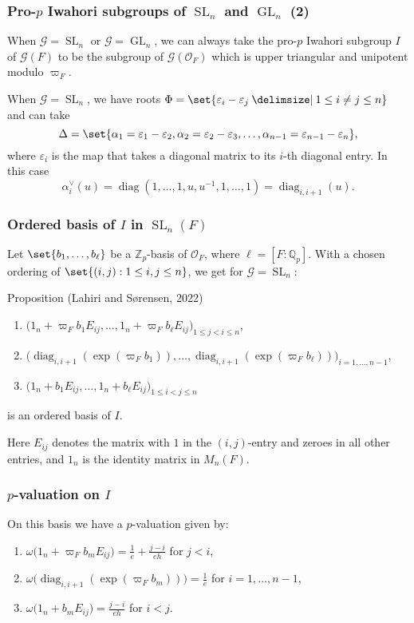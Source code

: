\documentclass{beamer}
\newcommand*\Z{\mathbb{Z}}
\newcommand*\Q{\mathbb{Q}}
\newcommand*\setSymbol[1][]{
  \nonscript\:#1\vert\allowbreak\nonscript\:\mathopen{}
}
\providecommand\given{}
\renewcommand*\given{\setSymbol[\delimsize]}
\DeclareMathOperator{\GL}{GL} %
\DeclareMathOperator{\SL}{SL} %
\DeclareMathOperator{\diag}{diag} %
\newcommand*\sO{\mathcal{O}}
\newcommand*\gs[1]{\mathcal{#1}}
\begin{document}
\begin{frame}[fragile]
  \frametitle{Pro-$p$ Iwahori subgroups of $\SL_{n}$ and $\GL_{n}$ (2)}

  When $\gs{G} = \SL_{n}$ or $\gs{G} = \GL_{n}$, we can always take the pro-$p$ Iwahori subgroup $I$ of $\gs{G}(F)$ to be the subgroup of $\gs{G}(\sO_{F})$ which is upper triangular and unipotent modulo $\varpi_{F}$.

  \pause

  When $\gs{G} = \SL_{n}$, we have roots $\Phi = \set{\varepsilon_{i}-\varepsilon_{j} \given 1 \leq i \neq j \leq n}$ and can take \[ \Delta = \set{ \alpha_{1}=\varepsilon_{1}-\varepsilon_{2},\alpha_{2}=\varepsilon_{2}-\varepsilon_{3},\dotsc, \alpha_{n-1}=\varepsilon_{n-1}-\varepsilon_{n} }, \] where $\varepsilon_{i}$ is the map that takes a diagonal matrix to its $i$-th diagonal entry. In this case \[ \alpha_{i}^{\vee}(u) = \diag(1,\dotsc,1,u,u^{-1},1,\dotsc,1) = \diag_{i,i+1}(u). \]
\end{frame}


\begin{frame}
  \frametitle{Ordered basis of $I$ in $\SL_{n}(F)$}

  Let $\set{b_{1},\dotsc,b_{\ell}}$ be a $\Z_{p}$-basis of $\sO_{F}$, where $\ell = [F:\Q_{p}]$. With a chosen ordering of $\set{(i,j) : 1 \leq i,j \leq n}$, we get for $\gs{G} = \SL_{n}$:
  \begin{block}{Proposition (Lahiri and Sørensen, 2022)}
    \begin{enumerate}[$\bullet$]
      \item $\bigl( 1_{n}+\varpi_{F}b_{1}E_{ij},\dotsc, 1_{n}+\varpi_{F}b_{\ell}E_{ij} \bigr)_{1 \leq j < i \leq n}$,
      \item $\bigl( \diag_{i,i+1}(\exp(\varpi_{F}b_{1})), \dotsc, \diag_{i,i+1}(\exp(\varpi_{F}b_{\ell})) \bigr)_{i=1,\dotsc,n-1}$,
      \item $\bigl( 1_{n}+b_{1}E_{ij}, \dotsc, 1_{n}+b_{\ell}E_{ij} \bigr)_{1 \leq i < j \leq n}$
    \end{enumerate}
    is an ordered basis of $I$.
  \end{block}

  Here $E_{ij}$ denotes the matrix with $1$ in the $(i,j)$-entry and zeroes in all other entries, and $1_{n}$ is the identity matrix in $M_{n}(F)$.
\end{frame}

\begin{frame}
  \frametitle{$p$-valuation on $I$}

  On this basis we have a $p$-valuation given by:
  \begin{enumerate}[$\bullet$]
    \item $\omega\bigl( 1_{n}+\varpi_{F}b_{m}E_{ij} \bigr) = \frac{1}{e} + \frac{j-i}{eh}$ for $j<i$,
    \item $\omega\bigl( \diag_{i,i+1}(\exp(\varpi_{F}b_{m})) \bigr) = \frac{1}{e}$ for $i=1,\dotsc,n-1$,
    \item $\omega\bigl( 1_{n}+b_{m}E_{ij} \bigr) = \frac{j-i}{eh}$ for $i<j$.
  \end{enumerate}
\end{frame}
\end{document}
